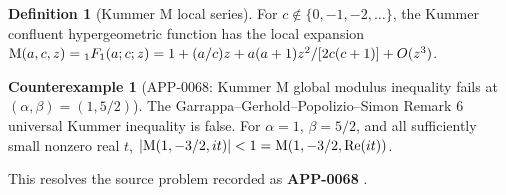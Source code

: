 \documentclass[11pt]{article}
\numberwithin{equation}{section}
\theoremstyle{definition}
\newtheorem{definition}{Definition}[section]
\newtheorem{counterexample}[theorem]{Counterexample}
\theoremstyle{remark}
\newcommand{\1}{\mathbf 1}
\begin{document}
\begin{definition}[Kummer M local series]
\label{res:kummerm-localseries}
For \(c\notin\{0,-1,-2,\ldots\}\), the Kummer confluent hypergeometric function has the local expansion \({\rm M}(a,c,z)={}_1F_1(a;c;z)=1+(a/c)z+a(a+1)z^2/[2c(c+1)]+O(z^3)\).
\end{definition}

\begin{counterexample}[APP-0068: Kummer M global modulus inequality fails at \((\alpha,\beta)=(1,5/2)\)]
\label{res:kummer-m-global-modulus-inequality-fails-alpha1-beta5halves}
The Garrappa--Gerhold--Popolizio--Simon Remark 6 universal Kummer inequality is false. For \(\alpha=1\), \(\beta=5/2\), and all sufficiently small nonzero real \(t\), \(|{\rm M}(1,-3/2,it)|<1={\rm M}(1,-3/2,\operatorname{Re}(it))\).



This resolves the source problem recorded as \textbf{APP-0068} \cite{app-app-0068-source}.
\end{counterexample}
\end{document}
